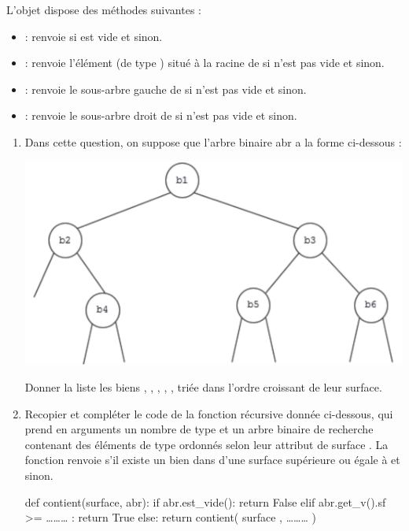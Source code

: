 \documentclass[11pt,a4paper,french,twoside]{PMCours}
\begin{document}
\begin{enumerate}
L'objet  dispose des méthodes suivantes :
\begin{itemize}
\item[]  : renvoie  si  est vide et  sinon.
\item[]  : renvoie l'élément (de type ) situé à la racine de  si  n'est
pas vide et  sinon.
\item[]  : renvoie le sous-arbre gauche de  si  n'est pas vide et 
sinon.
\item[]  : renvoie le sous-arbre droit de  si  n'est pas vide et  sinon.
\end{itemize}

\begin{enumerate}
\item Dans cette question, on suppose que l'arbre binaire abr a la forme ci-dessous :
\begin{center}
    \includegraphics[width=0.7\linewidth]{BacBlanc2Sujet1_NSI2122-img6.png}
\end{center}
Donner la liste les biens , , , , ,  triée dans l'ordre croissant de leur surface.
\item Recopier et compléter le code de la fonction récursive  donnée ci-dessous, qui
prend en arguments un nombre  de type  et un arbre binaire de recherche
 contenant des éléments de type  ordonnés selon leur attribut de surface . La
fonction  renvoie  s'il existe un bien dans  d'une
surface supérieure ou égale à  et  sinon.
\begin{Python*}
def contient(surface, abr):
    if abr.est_vide():
        return False
    elif abr.get_v().sf >= ……… :
        return True 
    else:
        return contient( surface , ……… ) 
\end{Python*}
\end{enumerate}
\end{enumerate}
\end{document}
